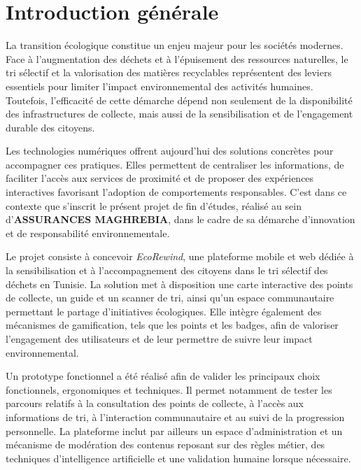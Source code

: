 \chapter*{Introduction générale}

La transition écologique constitue un enjeu majeur pour les sociétés modernes. Face à l'augmentation des déchets et à l'épuisement des ressources naturelles, le tri sélectif et la valorisation des matières recyclables représentent des leviers essentiels pour limiter l'impact environnemental des activités humaines. Toutefois, l'efficacité de cette démarche dépend non seulement de la disponibilité des infrastructures de collecte, mais aussi de la sensibilisation et de l'engagement durable des citoyens.

Les technologies numériques offrent aujourd'hui des solutions concrètes pour accompagner ces pratiques. Elles permettent de centraliser les informations, de faciliter l'accès aux services de proximité et de proposer des expériences interactives favorisant l'adoption de comportements responsables. C'est dans ce contexte que s'inscrit le présent projet de fin d'études, réalisé au sein d'\textbf{ASSURANCES MAGHREBIA}, dans le cadre de sa démarche d'innovation et de responsabilité environnementale.

Le projet consiste à concevoir \textit{EcoRewind}, une plateforme mobile et web dédiée à la sensibilisation et à l'accompagnement des citoyens dans le tri sélectif des déchets en Tunisie. La solution met à disposition une carte interactive des points de collecte, un guide et un scanner de tri, ainsi qu'un espace communautaire permettant le partage d'initiatives écologiques. Elle intègre également des mécanismes de gamification, tels que les points et les badges, afin de valoriser l'engagement des utilisateurs et de leur permettre de suivre leur impact environnemental.

Un prototype fonctionnel a été réalisé afin de valider les principaux choix fonctionnels, ergonomiques et techniques. Il permet notamment de tester les parcours relatifs à la consultation des points de collecte, à l'accès aux informations de tri, à l'interaction communautaire et au suivi de la progression personnelle. La plateforme inclut par ailleurs un espace d'administration et un mécanisme de modération des contenus reposant sur des règles métier, des techniques d'intelligence artificielle et une validation humaine lorsque nécessaire.

